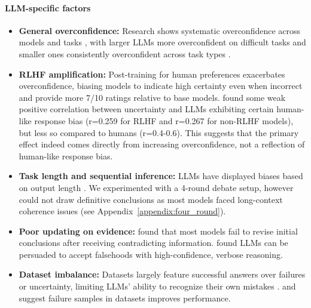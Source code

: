 \documentclass{article}
\begin{document}
\paragraph{LLM-specific factors}
\begin{itemize}
    \item \textbf{General overconfidence:} Research shows systematic overconfidence across models and tasks \citep{chhikara2025mindconfidencegapoverconfidence,xiong2024uncertainty}, with larger LLMs more overconfident on difficult tasks and smaller ones consistently overconfident across task types \citep{wen2024from}.

    \item \textbf{RLHF amplification:} Post-training for human preferences exacerbates overconfidence, biasing models to indicate high certainty even when incorrect \citep{leng2025tamingoverconfidencellmsreward} and provide more 7/10 ratings \citep{west2025basemodelsbeataligned,openai2024gpt4technicalreport} relative to base models. \citet{tjuatja2024llmsexhibithumanlikeresponse} found some weak positive correlation between uncertainty and LLMs exhibiting certain human-like response bias (r=0.259 for RLHF and r=0.267 for non-RLHF models), but less so compared to humans (r=0.4-0.6). This suggests that the primary effect indeed comes directly from increasing overconfidence, not a reflection of human-like response bias. 
    
    \item \textbf{Task length and sequential inference:} LLMs have displayed biases based on output length \citep{liu2025understandingr1zeroliketrainingcritical}. We experimented with a 4-round debate setup, however could not draw definitive conclusions as most models faced long-context coherence issues (see Appendix~\ref{appendix:four_round}).

    \item \textbf{Poor updating on evidence:} \citet{wilie2024beliefrevisionadaptabilitylarge} found that most models fail to revise initial conclusions after receiving contradicting information. \citet{agarwal2025persuasionoverridestruthmultiagent} found LLMs can be persuaded to accept falsehoods with high-confidence, verbose reasoning.

    \item \textbf{Dataset imbalance:} Datasets largely feature successful answers over failures or uncertainty, limiting LLMs' ability to recognize their own mistakes \citep{zhou2023navigatinggreyareaexpressions}. \citet{chung2025learningfailuresmultiattemptreinforcement} and \cite{stechly2025semanticsunreasonableeffectivenessreasonless} suggest failure samples in datasets improves performance.
\end{itemize}
\end{document}
